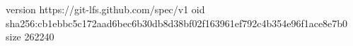 version https://git-lfs.github.com/spec/v1
oid sha256:cb1ebbc5c172aad6bec6b30db8d38bf02f163961ef792c4b354e96f1ace8e7b0
size 262240
